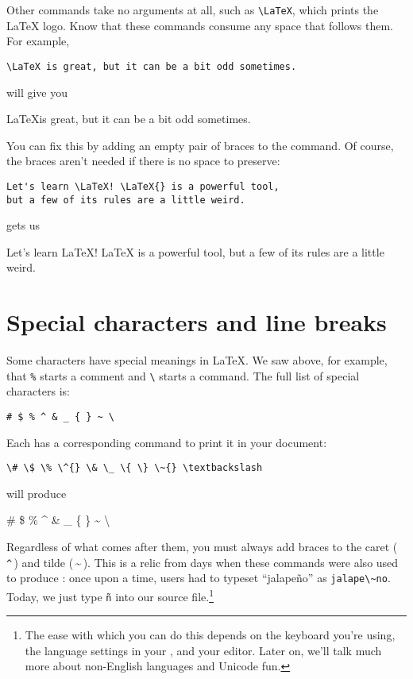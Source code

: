 Other commands take no arguments at all, such as \verb|\LaTeX|,
which prints the \LaTeX{} logo.
Know that these commands consume any space that follows them.
For example,
\begin{leftfigure}
\begin{lstlisting}
\LaTeX is great, but it can be a bit odd sometimes.
\end{lstlisting}
\end{leftfigure}
will give you
\begin{leftfigure}
\lm \LaTeX is great, but it can be a bit odd sometimes.
\end{leftfigure}
You can fix this by adding an empty pair of braces to the command.
Of course, the braces aren't needed if there is no space to preserve:
\begin{leftfigure}
\begin{lstlisting}
Let's learn \LaTeX! \LaTeX{} is a powerful tool,
but a few of its rules are a little weird.
\end{lstlisting}
\end{leftfigure}
gets us
\begin{leftfigure}
\lm Let's learn \LaTeX! \LaTeX{} is a powerful tool,
but a few of its rules are a little weird.
\end{leftfigure}

\section{Special characters and line breaks}

Some characters have special meanings in \LaTeX.
We saw above, for example, that \verb|%| starts a comment
and \verb|\| starts a command.
The full list of special characters is:
\begin{leftfigure}
\begin{lstlisting}
# $ % ^ & _ { } ~ \
\end{lstlisting}
\end{leftfigure}
Each has a corresponding command
to print it in your document:
\begin{leftfigure}
\begin{lstlisting}
\# \$ \% \^{} \& \_ \{ \} \~{} \textbackslash
\end{lstlisting}
\end{leftfigure}
will produce
\begin{leftfigure}
\lm \# \$ \% \^{} \& \_ \{ \} \~{} \textbackslash
\end{leftfigure}
Regardless of what comes after them, you must always add braces to
the caret (\,\texttt{\^{}}\,) and tilde (\,\~{}\,).
This is a relic from days when these commands were also used to produce
:
once upon a time, users had to typeset ``jalapeño'' as
\verb|jalape\~no|.
Today, we just type \texttt{ñ} into our source
file.\punckern\footnote{The ease with which you can do this depends
on the keyboard you're using, the language settings in your ,
and your editor.
Later on, we'll talk much more about non-English languages and Unicode fun.}

